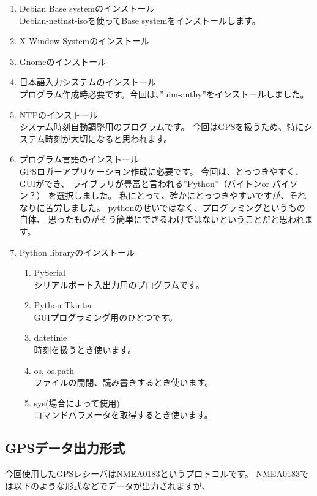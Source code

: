 \documentclass[mingoth,a4paper]{jsarticle}
\begin{document}
\begin{enumerate}
      \item Debian Base systemのインストール \\
    Debian-netinst-isoを使ってBase systemをインストールします。
      \item X Window Systemのインストール
      \item Gnomeのインストール
      \item 日本語入力システムのインストール \\
    プログラム作成時必要です。今回は、”uim-anthy”をインストールしました。
      \item NTPのインストール \\
    システム時刻自動調整用のプログラムです。
    今回はGPSを扱うため、特にシステム時刻が大切になると思われます。
      \item プログラム言語のインストール \\
    GPSロガーアプリケーション作成に必要です。
    今回は、とっつきやすく、GUIができ、
    ライブラリが豊富と言われる”Python”（バイトンor パイソン？）
    を選択しました。
    私にとって、確かにとっつきやすいですが、それなりに苦労しました。
    pythonのせいではなく、プログラミングというもの自体、
    思ったものがそう簡単にできるわけではないということだと思われます。
      \item Python libraryのインストール
    \begin{enumerate}
          \item PySerial \\
        シリアルポート入出力用のプログラムです。
          \item Python Tkinter \\
        GUIプログラミング用のひとつです。
          \item datetime \\
        時刻を扱うとき使います。
          \item os, os.path \\
        ファイルの開閉、読み書きするとき使います。
          \item sys(場合によって使用) \\
        コマンドパラメータを取得するとき使います。
    \end{enumerate}
\end{enumerate}

\subsection{GPSデータ出力形式}
今回使用したGPSレシーバはNMEA0183というプロトコルです。
NMEA0183では以下のような形式などでデータが出力されますが、
\end{document}
